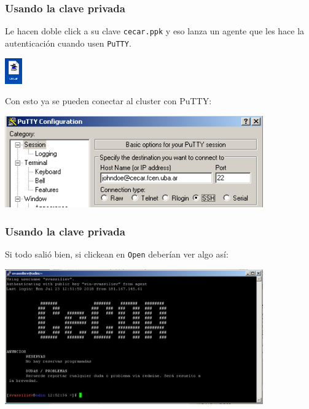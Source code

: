\documentclass[handout]{beamer}
\begin{document}
\begin{frame}
\frametitle{Usando la clave privada}
Le hacen doble click a su clave \Verb=cecar.ppk= y eso lanza un agente que les hace la autenticación cuando usen \Verb=PuTTY=.

\begin{center}
\includegraphics[width=2em]{cecarppk.png}
\end{center}

Con esto ya se pueden conectar al cluster con PuTTY:
\begin{center}
\includegraphics[width=30em]{putty-cfg.png}
\end{center}
\end{frame}

\begin{frame}
\frametitle{Usando la clave privada}
Si todo salió bien, si clickean en \Verb=Open= deberían ver algo así:
\begin{center}
\includegraphics[width=30em]{putty-session.png}
\end{center}
\end{frame}
\end{document}
